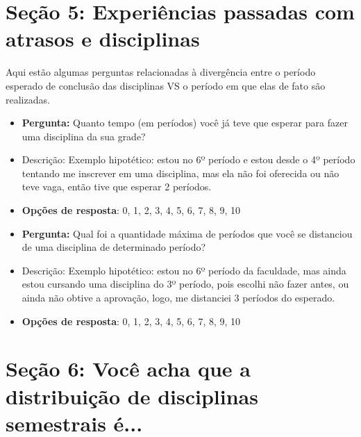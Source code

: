 \begin{apendicesenv}
    \section*{Seção 5: Experiências passadas com atrasos e disciplinas}

        Aqui estão algumas perguntas relacionadas à divergência entre o período esperado de conclusão das disciplinas VS o período em que elas de fato são realizadas.

        \begin{itemize}
            \item \textbf{Pergunta:} Quanto tempo (em períodos) você já teve que esperar para fazer uma disciplina da sua grade?
            \item Descrição: Exemplo hipotético: estou no 6º período e estou desde o 4º período tentando me inscrever em uma disciplina, mas ela não foi oferecida ou não teve vaga, então tive que esperar 2 períodos.
            \item \textbf{Opções de resposta}: 0, 1, 2, 3, 4, 5, 6, 7, 8, 9, 10
        \end{itemize}

        \begin{itemize}
            \item \textbf{Pergunta:} Qual foi a quantidade máxima de períodos que você se distanciou de uma disciplina de determinado período?
            \item Descrição: Exemplo hipotético: estou no 6º período da faculdade, mas ainda estou cursando uma disciplina do 3º período, pois escolhi não fazer antes, ou ainda não obtive a aprovação, logo, me distanciei 3 períodos do esperado.
            \item \textbf{Opções de resposta}: 0, 1, 2, 3, 4, 5, 6, 7, 8, 9, 10
        \end{itemize}

        \section*{Seção 6: Você acha que a distribuição de disciplinas semestrais é...}


\end{apendicesenv}
